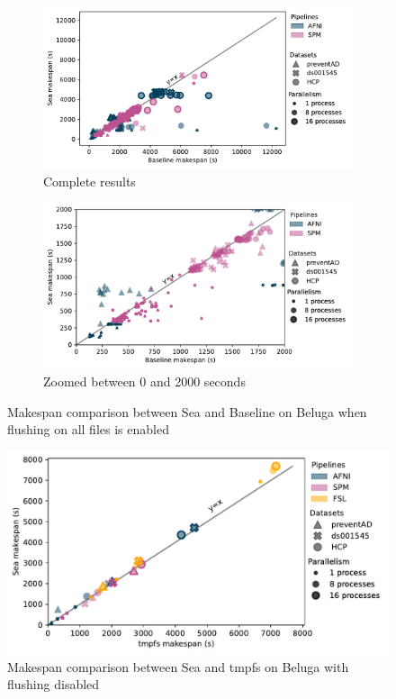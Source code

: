 \begin{figure}
\begin{subfigure}{\textwidth}
    \centering
    \captionsetup{width=.85\linewidth}
    \includegraphics[width=\columnwidth]{figures/sea-neuro/beluga_withflush_nozoom.pdf}%
    \caption{Complete results}\label{fig:seaneuro:belugafullwf}
\end{subfigure}
\begin{subfigure}{\textwidth}
    \centering
    \captionsetup{width=.85\linewidth}
    \includegraphics[width=\linewidth]{figures/sea-neuro/beluga_withflush_zoom.pdf}
    \caption{Zoomed between 0 and 2000 seconds}\label{fig:seaneuro:belugazoomwf}
\end{subfigure}
\caption{Makespan comparison between Sea and Baseline on Beluga when flushing on all files is enabled}
\label{fig:seaneuro:beluga-wflush}
\end{figure}

\begin{figure}
\centering
\includegraphics[width=\columnwidth]{figures/sea-neuro/beluga_sea_tmpfs.pdf}%
\caption{Makespan comparison between Sea and tmpfs on Beluga with flushing disabled}
\label{fig:seaneuro:tmpfs}
\end{figure}

